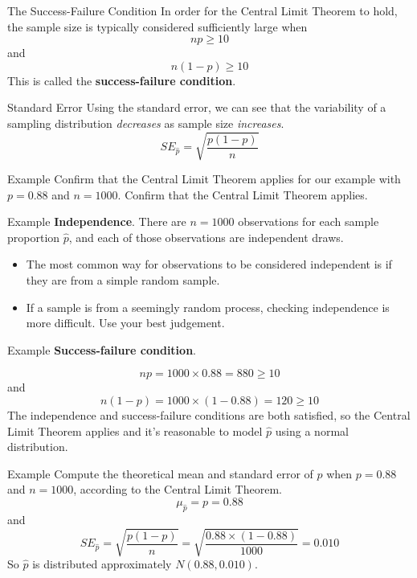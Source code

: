 \begin{frame}{The Success-Failure Condition}
    In order for the Central Limit Theorem to hold, the sample size is typically considered sufficiently large when 
    \[
        np \ge 10
    \]
    and 
    \[
        n(1 − p) \ge 10
    \]
    \vspace{12pt}This is called the \textbf{success-failure condition}.
\end{frame}

\begin{frame}{Standard Error}
    Using the standard error, we can see that the variability of a sampling distribution \textit{decreases} as sample size \textit{increases}.
    \[
        SE_{\hat{p}} = \sqrt{\frac{p(1-p)}{n}}
    \]
\end{frame}

\begin{frame}{Example}
    Confirm that the Central Limit Theorem applies for our example with $p=0.88$ and $n=1000$. Confirm that the Central Limit Theorem applies.
\end{frame}

\begin{frame}{Example}
    \textbf{Independence}. There are $n = 1000$ observations for each sample proportion $\hat{p}$, and each of those observations are independent draws. 
    
    \begin{itemize}
        \item The most common way for observations to be considered independent is if they are from a simple random sample.
        \item If a sample is from a seemingly random process, checking independence is more difficult. Use your best judgement.
    \end{itemize}
\end{frame}

\begin{frame}{Example}
    \textbf{Success-failure condition}. 
    
    \[
        np = 1000 \times 0.88 = 880 \ge 10
    \]
    and
    \[
        n(1 − p) = 1000 \times (1 − 0.88) = 120 \ge 10
    \]
    The independence and success-failure conditions are both satisfied, so the Central Limit Theorem applies and it’s reasonable to model $\hat{p}$ using a normal distribution.
\end{frame}

\begin{frame}{Example}
    Compute the theoretical mean and standard error of $\hat{p}$ when $p = 0.88$ and $n = 1000$, according to the Central Limit Theorem.
    \[
        \mu_{\hat{p}} = p = 0.88
    \]
    and
    \[
        SE_{\hat{p}} = \sqrt{\frac{p(1-p)}{n}} = \sqrt{\frac{0.88\times(1-0.88)}{1000}} = 0.010
    \]
    \vspace{12pt}So $\hat{p}$ is distributed approximately $N(0.88, 0.010)$.
\end{frame}

